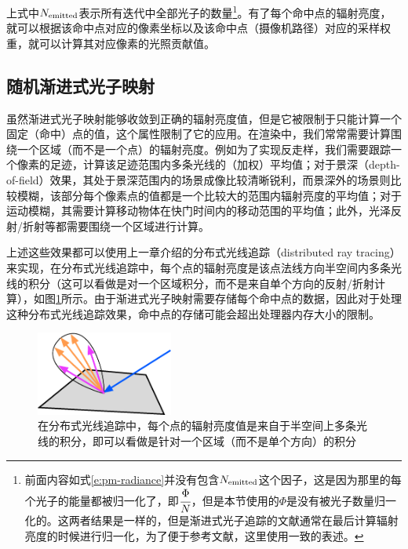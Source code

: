 上式中$N_{\rm emitted}$表示所有迭代中全部光子的数量\footnote{前面内容如式\ref{e:pm-radiance}并没有包含$N_{\rm emitted}$这个因子，这是因为那里的每个光子的能量都被归一化了，即$ \cfrac{\Phi}{N}$，但是本节使用的$\Phi$是没有被光子数量归一化的。这两者结果是一样的，但是渐进式光子追踪的文献通常在最后计算辐射亮度的时候进行归一化，为了便于参考文献，这里使用一致的表述。}。有了每个命中点的辐射亮度，就可以根据该命中点对应的像素坐标以及该命中点（摄像机路径）对应的采样权重，就可以计算其对应像素的光照贡献值。






\subsection{随机渐进式光子映射}\label{sec:pm-stochastic-ppm}
虽然渐进式光子映射能够收敛到正确的辐射亮度值，但是它被限制于只能计算一个固定（命中）点的值，这个属性限制了它的应用。在渲染中，我们常常需要计算围绕一个区域（而不是一个点）的辐射亮度。例如为了实现反走样，我们需要跟踪一个像素的足迹，计算该足迹范围内多条光线的（加权）平均值；对于景深（depth-of-field）效果，其处于景深范围内的场景成像比较清晰锐利，而景深外的场景则比较模糊，该部分每个像素点的值都是一个比较大的范围内辐射亮度的平均值；对于运动模糊，其需要计算移动物体在快门时间内的移动范围的平均值；此外，光泽反射/折射等都需要围绕一个区域进行计算。

上述这些效果都可以使用上一章介绍的分布式光线追踪（distributed ray tracing）来实现，在分布式光线追踪\cite{a:DistributedRayTracing}中，每个点的辐射亮度是该点法线方向半空间内多条光线的积分（这可以看做是对一个区域积分，而不是来自单个方向的反射/折射计算），如图\ref{f:pm-distributed-rt}所示。由于渐进式光子映射需要存储每个命中点的数据，因此对于处理这种分布式光线追踪效果，命中点的存储可能会超出处理器内存大小的限制。

\begin{figure}
	\sidecaption
	\includegraphics[width=0.4\textwidth]{figures/pm/distributed-rt}
	\caption{在分布式光线追踪中，每个点的辐射亮度值是来自于半空间上多条光线的积分，即可以看做是针对一个区域（而不是单个方向）的积分}
	\label{f:pm-distributed-rt}
\end{figure}

